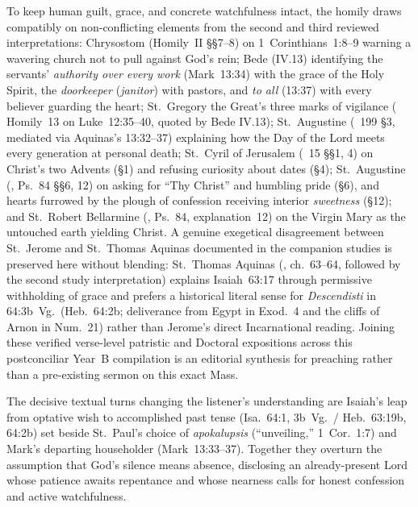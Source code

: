 To keep human guilt, grace, and concrete watchfulness intact, the homily draws compatibly on non-conflicting elements from the second and third reviewed interpretations: Chrysostom (Homily~II §§7--8) on 1~Corinthians~1:8--9 warning a wavering church not to pull against God's rein; Bede (IV.13) identifying the servants' \emph{authority over every work} (Mark~13:34) with the grace of the Holy Spirit, the \emph{doorkeeper} (\emph{janitor}) with pastors, and \emph{to all} (13:37) with every believer guarding the heart; St.~Gregory the Great's three marks of vigilance ( Homily~13 on Luke~12:35--40, quoted by Bede IV.13); St.~Augustine (~199 §3, mediated via Aquinas's  13:32--37) explaining how the Day of the Lord meets every generation at personal death; St.~Cyril of Jerusalem (~15 §§1, 4) on Christ's two Advents (§1) and refusing curiosity about dates (§4); St.~Augustine (, Ps.~84 §§6, 12) on asking for ``Thy Christ'' and humbling pride (§6), and hearts furrowed by the plough of confession receiving interior \emph{sweetness} (§12); and St.~Robert Bellarmine (, Ps.~84, explanation~12) on the Virgin Mary as the untouched earth yielding Christ. A genuine exegetical disagreement between St.~Jerome and St.~Thomas Aquinas documented in the companion studies is preserved here without blending: St.~Thomas Aquinas (, ch.~63--64, followed by the second study interpretation) explains Isaiah~63:17 through permissive withholding of grace and prefers a historical literal sense for \emph{Descendisti} in 64:3b~Vg.\ (Heb.~64:2b; deliverance from Egypt in Exod.~4 and the cliffs of Arnon in Num.~21) rather than Jerome's direct Incarnational reading. Joining these verified verse-level patristic and Doctoral expositions across this postconciliar Year~B compilation is an editorial synthesis for preaching rather than a pre-existing sermon on this exact Mass.

The decisive textual turns changing the listener's understanding are Isaiah's leap from optative wish to accomplished past tense (Isa.~64:1, 3b~Vg.\ / Heb.~63:19b, 64:2b) set beside St.~Paul's choice of \emph{apokalupsis} (``unveiling,'' 1~Cor.~1:7) and Mark's departing householder (Mark~13:33--37). Together they overturn the assumption that God's silence means absence, disclosing an already-present Lord whose patience awaits repentance and whose nearness calls for honest confession and active watchfulness.

